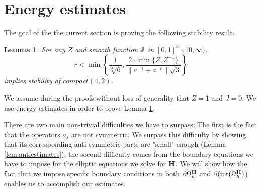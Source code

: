 \documentclass[12pt,reqno]{amsart}
\newcommand{\e}{{\bf E}}
\newcommand{\h}{{\bf H}}
\newcommand{\J}{{\bf J}}
\newtheorem{lemma}[theorem]{Lemma}
\newtheorem{rem}[theorem]{Remark}
\theoremstyle{definition}
\numberwithin{equation}{section}
\newcommand{\intr}[1]{\mathrm{int}(#1)}
\def\Gwh{\Omega_h}
\begin{document}
%

	


	

	\section{Energy estimates}
	The goal of the the current section is proving the following stability result.
	\begin{lemma}\label{lem:coer}
		For any $Z$ and smooth function $\J$ in $[0,1]^3\times [0,\infty)$, 
		$$
		r<\min \left \{  \frac{1}{\sqrt[3]{6}},\frac{2\cdot\min\{Z,Z^{-1}\}}
		{\|a^{-1}+a^{-t}\|\sqrt{3}}  \right \}
	$$
	implies stability of $compact(4,2)$.
 		\end{lemma}
 
 We assume during the proofs without loss of generality that $Z=1$ and $J=0$.
We use energy estimates in order to prove Lemma \ref{lem:coer}.

There are two main non-trivial difficulties we have to surpass:
 The first is the fact that the operators $a_s$ are not symmetric. We surpass this difficulty by showing that its corresponding  anti-symmetric parts are "small" enough (Lemma \ref{lem:antiestimates});
 the second difficulty comes from the boundary equations we have to impose for the elliptic equations   we solve for $\h$.
  We will show how the fact that  we impose specific boundary conditions  in both $\partial \Gwh^\h$ and $\partial (\intr{\Gwh^{\h}}$) enables  us to accomplish our estimates.  
 
\end{document}
